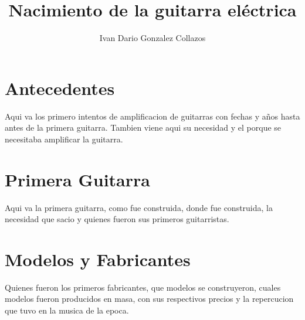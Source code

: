 \documentclass[12pt, a4paper]{article}
\title{Nacimiento de la guitarra eléctrica}
\author{Ivan Dario Gonzalez Collazos}
\date{}
\begin{document}
\maketitle

\section{Antecedentes}
Aqui va los primero intentos de amplificacion de guitarras con fechas y años hasta antes de la primera guitarra. Tambien viene aqui su necesidad y el porque se necesitaba amplificar la guitarra.

\section{Primera Guitarra}
Aqui va la primera guitarra, como fue construida, donde fue construida, la necesidad que sacio y quienes fueron sus primeros guitarristas.

\section{Modelos y Fabricantes}
Quienes fueron los primeros fabricantes, que modelos se construyeron, cuales modelos fueron producidos en masa, con sus respectivos precios y la repercucion que tuvo en la musica de la epoca.
\end{document}
